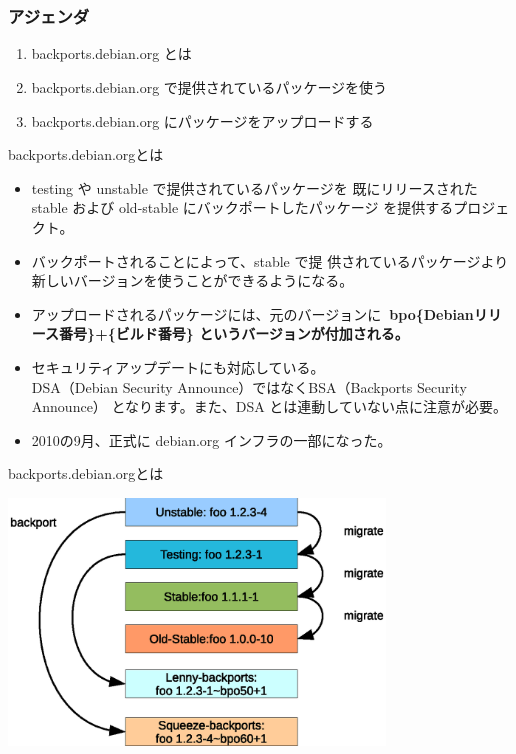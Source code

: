 \frame{\titlepage{}}

\section{}

\begin{frame}
 \frametitle{アジェンダ}
  \begin{enumerate}
  \item backports.debian.org とは
  \item backports.debian.org で提供されているパッケージを使う
  \item backports.debian.org にパッケージをアップロードする
  \end{enumerate}
\end{frame}

\begin{frame}{backports.debian.orgとは}
\begin{itemize}[<+->]
\item testing や unstable で提供されているパッケージを
既にリリースされた stable および old-stable にバックポートしたパッケージ
を提供するプロジェクト。
\item バックポートされることによって、stable で提
供されているパッケージより新しいバージョンを使うことができるようになる。
\item アップロードされるパッケージには、元のバージョンに\bf{~{}bpo\{Debianリリース番号\}+\{ビルド番号\}}
というバージョンが付加される。
\item セキュリティアップデートにも対応している。\\
DSA（Debian Security Announce）ではなくBSA（Backports Security Announce）
となります。また、DSA とは連動していない点に注意が必要。
\item 2010の9月、正式に debian.org インフラの一部になった。
\end{itemize}
\end{frame}

\begin{frame}[containsverbatim]{backports.debian.orgとは}

\begin{center}
\includegraphics[width=10cm]{image201104/backports-image_color.eps}
\end{center}

\end{frame}


